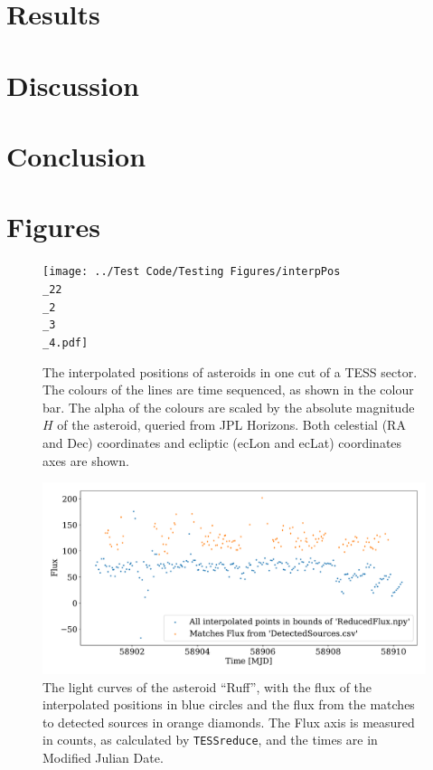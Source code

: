 \documentclass[12pt]{article}
\begin{document}
\section{Results}\label{Sec:Res}
\section{Discussion}\label{Sec:Disc}
\section{Conclusion}\label{Sec:Conc}

\section{Figures}

\begin{figure}
  \centering
    \texttt{[image: ../Test Code/Testing Figures/interpPos\\\_22\\\_2\\\_3\\\_4.pdf]}
    \caption[Interpolated positions of asteroids]{The interpolated positions of asteroids in one cut of a TESS sector. 
    The colours of the lines are time sequenced, as shown in the colour bar.
    The alpha of the colours are scaled by the absolute magnitude $H$ of the asteroid, queried from JPL Horizons. 
    Both celestial (RA and Dec) coordinates and ecliptic (ecLon and ecLat) coordinates axes are shown.
    }
    \label{Fig:interpPos}
\end{figure}



\begin{figure}
  \centering
  \includegraphics[width =\columnwidth]{../Test Code/Testing Figures/differentFluxes Ruff .pdf}
  \caption[Light curves of Ruff]{The light curves of the asteroid ``Ruff'', with the flux of the interpolated positions in blue circles and the flux from the matches to detected sources in orange diamonds.
  The Flux axis is measured in counts, as calculated by \texttt{TESSreduce}, and the times are in Modified Julian Date.}
  \label{Fig:DifFlux}
\end{figure}
    
\end{document}
